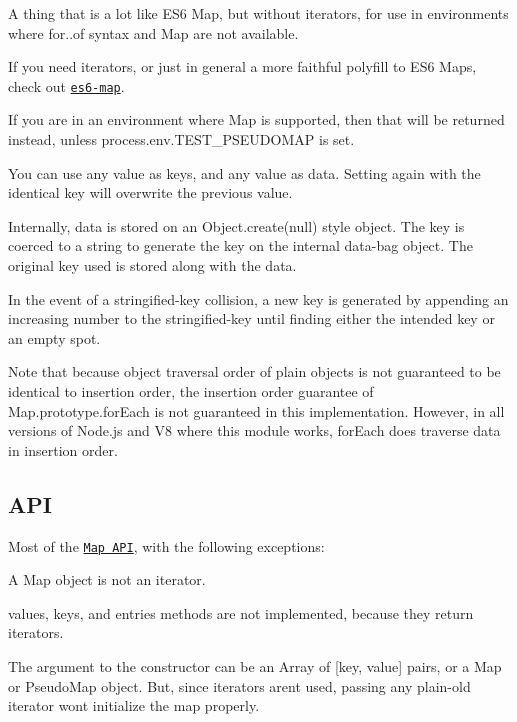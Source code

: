 A thing that is a lot like E\+S6 {\ttfamily Map}, but without iterators, for use in environments where {\ttfamily for..of} syntax and {\ttfamily Map} are not available.

If you need iterators, or just in general a more faithful polyfill to E\+S6 Maps, check out \href{http://npm.im/es6-map}{\tt es6-\/map}.

If you are in an environment where {\ttfamily Map} is supported, then that will be returned instead, unless {\ttfamily process.\+env.\+T\+E\+S\+T\+\_\+\+P\+S\+E\+U\+D\+O\+M\+AP} is set.

You can use any value as keys, and any value as data. Setting again with the identical key will overwrite the previous value.

Internally, data is stored on an {\ttfamily Object.\+create(null)} style object. The key is coerced to a string to generate the key on the internal data-\/bag object. The original key used is stored along with the data.

In the event of a stringified-\/key collision, a new key is generated by appending an increasing number to the stringified-\/key until finding either the intended key or an empty spot.

Note that because object traversal order of plain objects is not guaranteed to be identical to insertion order, the insertion order guarantee of {\ttfamily Map.\+prototype.\+for\+Each} is not guaranteed in this implementation. However, in all versions of Node.\+js and V8 where this module works, {\ttfamily for\+Each} does traverse data in insertion order.

\subsection*{A\+PI}

Most of the \href{https://developer.mozilla.org/en-US/docs/Web/JavaScript/Reference/Global_Objects/Map}{\tt Map A\+PI}, with the following exceptions\+:


\begin{DoxyEnumerate}
\item A {\ttfamily Map} object is not an iterator.
\item {\ttfamily values}, {\ttfamily keys}, and {\ttfamily entries} methods are not implemented, because they return iterators.
\item The argument to the constructor can be an Array of {\ttfamily \mbox{[}key, value\mbox{]}} pairs, or a {\ttfamily Map} or {\ttfamily Pseudo\+Map} object. But, since iterators aren\textquotesingle{}t used, passing any plain-\/old iterator won\textquotesingle{}t initialize the map properly.
\end{DoxyEnumerate}

